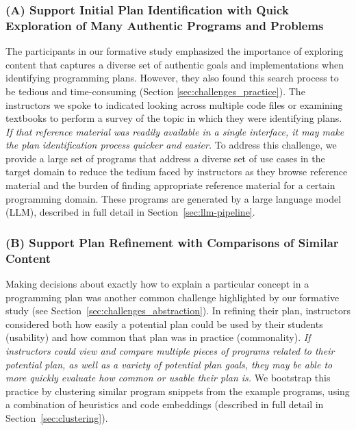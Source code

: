 \subsubsection*{(A) Support \textbf{Initial Plan Identification} with \textbf{Quick Exploration of Many Authentic Programs and Problems}} %
The participants in our formative study emphasized the importance of exploring content that captures a diverse set of authentic goals and implementations when identifying programming plans. However, they also found this search process to be tedious and time-consuming (Section \ref{sec:challenges_practice}). The instructors we spoke to indicated looking across multiple code files or examining textbooks to perform a survey of the topic in which they were identifying plans. \textit{If that reference material was readily available in a single interface, it may make the plan identification process quicker and easier.}
To address this challenge, we provide a large set of programs that address a diverse set of use cases in the target domain to reduce the tedium faced by instructors as they browse reference material and the burden of finding appropriate reference material for a certain programming domain.
These programs are generated by a large language model (LLM), described in full detail in Section~\ref{sec:llm-pipeline}. %

\subsubsection*{(B) Support \textbf{Plan Refinement} with \textbf{Comparisons of Similar Content}} %

Making decisions about exactly how to explain a particular concept in a programming plan was another common challenge highlighted by our formative study (see Section~\ref{sec:challenges_abstraction}). In refining their plan, instructors considered both how easily a potential plan could be used by their students (usability) and how common that plan was in practice (commonality). 
\textit{If instructors could view and compare multiple pieces of programs related to their potential plan, as well as a variety of potential plan goals, they may be able to more quickly evaluate how common or usable their plan is.}
We bootstrap this practice by clustering similar program snippets from the example programs, using a combination of heuristics and code embeddings (described in full detail in Section~\ref{sec:clustering}).

